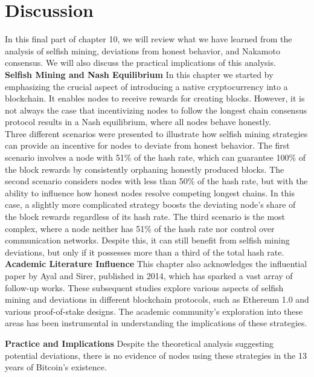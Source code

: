 \section{Discussion}
In this final part of chapter 10, we will review what we have learned from the analysis of selfish mining, deviations from honest behavior, and Nakamoto consensus. We will also discuss the practical implications of this analysis.\\

\noindent
\textbf{Selfish Mining and Nash Equilibrium}
In this chapter we started by emphasizing the crucial aspect of introducing a native cryptocurrency into a blockchain. It enables nodes to receive rewards for creating blocks. However, it is not always the case that incentivizing nodes to follow the longest chain consensus protocol results in a Nash equilibrium, where all nodes behave honestly.\\

Three different scenarios were presented to illustrate how selfish mining strategies can provide an incentive for nodes to deviate from honest behavior. The first scenario involves a node with 51\% of the hash rate, which can guarantee 100\% of the block rewards by consistently orphaning honestly produced blocks. The second scenario considers nodes with less than 50\% of the hash rate, but with the ability to influence how honest nodes resolve competing longest chains. In this case, a slightly more complicated strategy boosts the deviating node's share of the block rewards regardless of its hash rate. The third scenario is the most complex, where a node neither has 51\% of the hash rate nor control over communication networks. Despite this, it can still benefit from selfish mining deviations, but only if it possesses more than a third of the total hash rate.\\

\noindent
\textbf{Academic Literature Influence}
This chapter also acknowledges the influential paper by Ayal and Sirer, published in 2014, which has sparked a vast array of follow-up works. These subsequent studies explore various aspects of selfish mining and deviations in different blockchain protocols, such as Ethereum 1.0 and various proof-of-stake designs. The academic community's exploration into these areas has been instrumental in understanding the implications of these strategies.

\noindent
\textbf{Practice and Implications}
Despite the theoretical analysis suggesting potential deviations, there is no evidence of nodes using these strategies in the 13 years of Bitcoin's existence.

